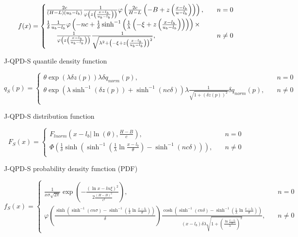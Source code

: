 \documentclass[
]{interact}
\begin{document}
\[
\begin{gathered}
f(x)=\begin{cases}
\frac{2c}{(H-L)(u_b-l_b)}\frac{1}{\varphi\left(z\left(\frac{x-l_b}{u_b-l_b}\right)\right)}\varphi\left(\frac{2c}{H-L}\left(-B+z\left(\frac{x-l_b}{u-l_b}\right)\right)\right), \quad &n=0\\
\frac{1}{\delta}\frac{1}{u_b-l_b}\varphi\left(-nc+\frac{1}{\delta}\sinh^{-1}\left(\frac{1}{\lambda}\left(-\xi+z\left(\frac{x-l_b}{u_b-l_b}\right)\right)\right)\right) \times \\ \indent
\frac{1}{\varphi\left(z\left(\frac{x-l_b}{u_b-l_b}\right)\right)}\frac{1}{\sqrt{\lambda^2+\left(-\xi+z\left(\frac{x-l_b}{u_b-l_b}\right)\right)^2}}, \quad &n\neq 0\\
\end{cases}
\end{gathered}
\]

J-QPD-S quantile density function

\[
q_S(p)=\begin{cases}
\theta\exp\left(\lambda\delta z(p)\right)\lambda\delta q_{norm}(p), \quad &n=0\\
\theta\exp\left(\lambda\sinh^{-1}(\delta z(p))+\sinh^{-1}(nc\delta)\right)\lambda\frac{1}{\sqrt{1+(\delta z(p))^2}}\delta q_{norm}(p), \quad &n\neq0\\
\end{cases}
\]

J-QPD-S distribution function

\[
F_S(x)=\begin{cases}
F_{lnorm}(x-l_b\vert \ln(\theta), \frac{H-B}{c}), \quad &n=0\\
\Phi\left(\frac{1}{\delta}\sinh\left(\sinh^{-1}\left(\frac{1}{\lambda}\ln\frac{x-l_b}{\theta}\right)-\sinh^{-1}(nc\delta)\right)\right), \quad &n\neq0\\
\end{cases}
\]

J-QPD-S probability density function (PDF)

\[
f_S(x)=\begin{cases}
\frac{1}{x\sigma\sqrt{2\pi}}\exp\left(-\frac{(\ln x-ln\xi)^2}{2\frac{(H-B)^2}{c^2}}\right), \quad &n=0\\
\varphi\left(\frac{\sinh(\sinh^{-1}(cn\sigma)-\sinh^{-1}(\frac{1}{\lambda}\ln\frac{x-l_b}{\theta}))}{\delta}\right)\frac{\cosh(\sinh^{-1}(cn\delta)-\sinh^{-1}(\frac{1}{\lambda}\ln\frac{x-l_b}{\theta}))}{(x-l_b)\delta\lambda\sqrt{1+\left(\frac{\ln\frac{x-l_b}{\theta}}{\lambda}\right)^2}}, \quad &n \neq 0
\end{cases}
\]
\end{document}
